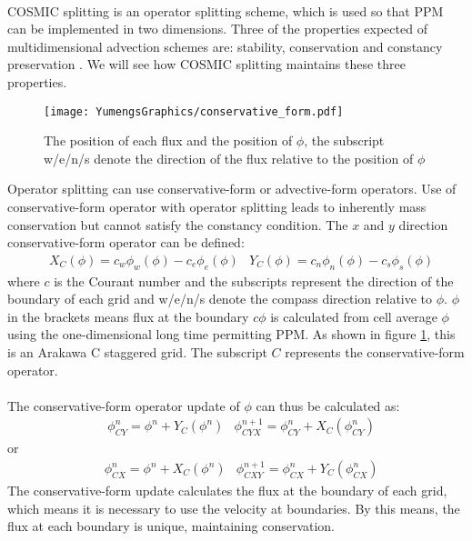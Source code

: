 \paragraph{}
COSMIC splitting is an operator splitting scheme, which is used so that PPM can be implemented in two dimensions. Three of the properties expected of multidimensional advection schemes are: stability, conservation and constancy preservation \citep{Lin1996}. We will see how COSMIC splitting \citep{Leonard1996} maintains these three properties.
\begin{figure}
\vspace{-10pt}
\centering
\texttt{[image: YumengsGraphics/conservative\_form.pdf]}
\vspace{-10pt}
\caption{The position of each flux and the position of $\phi$, the subscript w/e/n/s denote the direction of the flux relative to the position of $\phi$ \label{fig:2.2}}
\end{figure}
Operator splitting can use conservative-form or advective-form operators. Use of conservative-form operator with operator splitting leads to inherently mass conservation but cannot satisfy the constancy condition. The $x$ and $y$ direction conservative-form operator can be defined:
\begin{eqnarray}  \label{eq:2.13}
&X_{\scriptscriptstyle C}(\phi ) = c_{w}\phi_w(\phi )-c_e\phi_e(\phi ) 
&Y_{\scriptscriptstyle C}(\phi ) = c_{n}\phi_n(\phi )-c_s\phi_s(\phi )
\end{eqnarray}
where $c$ is the Courant number and the subscripts represent the direction of the boundary of each grid and w/e/n/s denote the compass direction relative to $\phi$. $\phi $ in the brackets means flux at the boundary $c\phi$ is calculated from cell average $\phi$ using the one-dimensional long time permitting PPM. As shown in figure \ref{fig:2.2}, this is an Arakawa C staggered grid. The subscript $C$ represents the conservative-form operator.
\paragraph{}
The conservative-form operator update of $\phi$ can thus be calculated as:
\begin{eqnarray} \label{eq:2.14}
&\phi^n_{\scriptscriptstyle CY} = \phi^n +Y_{\scriptscriptstyle C}(\phi^n)
&\phi^{n+1}_{\scriptscriptstyle CYX} = \phi^n_{\scriptscriptstyle CY} +X_{\scriptscriptstyle C}(\phi^n_{\scriptscriptstyle CY})
\end{eqnarray}
or
\begin{eqnarray*} 
&\phi^n_{\scriptscriptstyle CX} = \phi^n +X_{\scriptscriptstyle C}(\phi^n) 
&\phi^{n+1}_{\scriptscriptstyle CXY} = \phi^n_{\scriptscriptstyle CX} +Y_{\scriptscriptstyle C}(\phi^n_{\scriptscriptstyle CX})
\end{eqnarray*}
The conservative-form update calculates the flux at the boundary of each grid, which means it is necessary to use the velocity at boundaries.  By this means, the flux at each boundary is unique, maintaining conservation. 
